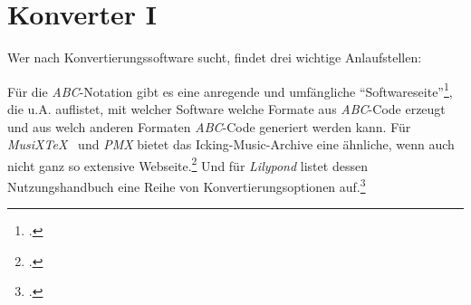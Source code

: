 %
%
%



\section{Konverter I}

Wer nach Konvertierungssoftware sucht, findet drei wichtige Anlaufstellen:

Für die \textit{ABC}-Notation gibt es eine anregende und umfängliche
\enquote{Softwareseite}\footcite[vgl.][\nopage wp]{Abc2018b}, die u.A.
auflistet, mit welcher Software welche Formate aus \textit{ABC}-Code erzeugt und
aus welch anderen Formaten \textit{ABC}-Code generiert werden kann. Für
\textit{MusiX\TeX\ } und \textit{PMX} bietet das Icking-Music-Archive eine
ähnliche, wenn auch nicht ganz so extensive Webseite.\footcite[vgl.][\nopage
wp]{Tennent2018b} Und für \textit{Lilypond} listet dessen Nutzungshandbuch eine Reihe von
Konvertierungsoptionen auf.\footcite[vgl.][42ff]{LilyPond2018e}

